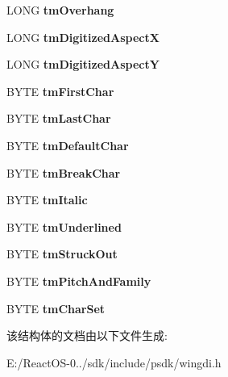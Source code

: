 \begin{DoxyCompactItemize}
\item 
\mbox{\label{structtag_t_e_x_t_m_e_t_r_i_c_a_ad7f31b8ebf63f7aecbfc6592e168623e}} 
L\+O\+NG {\bfseries tm\+Overhang}
\item 
\mbox{\label{structtag_t_e_x_t_m_e_t_r_i_c_a_a602bd74be514a5938fa1cf71aeb95735}} 
L\+O\+NG {\bfseries tm\+Digitized\+AspectX}
\item 
\mbox{\label{structtag_t_e_x_t_m_e_t_r_i_c_a_af0db78de6ae0a7a9deae760751c264df}} 
L\+O\+NG {\bfseries tm\+Digitized\+AspectY}
\item 
\mbox{\label{structtag_t_e_x_t_m_e_t_r_i_c_a_a687e4f4041f1556a3cdfb290fab9f537}} 
B\+Y\+TE {\bfseries tm\+First\+Char}
\item 
\mbox{\label{structtag_t_e_x_t_m_e_t_r_i_c_a_a9b9db2709aace9736bcb8652351560a2}} 
B\+Y\+TE {\bfseries tm\+Last\+Char}
\item 
\mbox{\label{structtag_t_e_x_t_m_e_t_r_i_c_a_acc3778badbf0a0e83d0ab1eec63034fe}} 
B\+Y\+TE {\bfseries tm\+Default\+Char}
\item 
\mbox{\label{structtag_t_e_x_t_m_e_t_r_i_c_a_a81dde87923e20e4c999a0d25eed0e51c}} 
B\+Y\+TE {\bfseries tm\+Break\+Char}
\item 
\mbox{\label{structtag_t_e_x_t_m_e_t_r_i_c_a_ae32c8f9ed7a97962c4b686974bca01e4}} 
B\+Y\+TE {\bfseries tm\+Italic}
\item 
\mbox{\label{structtag_t_e_x_t_m_e_t_r_i_c_a_a9f8af9b390557334f6a74b7cf28d4be9}} 
B\+Y\+TE {\bfseries tm\+Underlined}
\item 
\mbox{\label{structtag_t_e_x_t_m_e_t_r_i_c_a_a1a17f77641ca87f44cfdf66471f3243e}} 
B\+Y\+TE {\bfseries tm\+Struck\+Out}
\item 
\mbox{\label{structtag_t_e_x_t_m_e_t_r_i_c_a_a1d5673153740c61e4df44af20fa0a535}} 
B\+Y\+TE {\bfseries tm\+Pitch\+And\+Family}
\item 
\mbox{\label{structtag_t_e_x_t_m_e_t_r_i_c_a_a38610814d0d02b65de3ccc11923a6ff1}} 
B\+Y\+TE {\bfseries tm\+Char\+Set}
\end{DoxyCompactItemize}


该结构体的文档由以下文件生成\+:\begin{DoxyCompactItemize}
\item 
E\+:/\+React\+O\+S-\/0../sdk/include/psdk/wingdi.\+h\end{DoxyCompactItemize}
